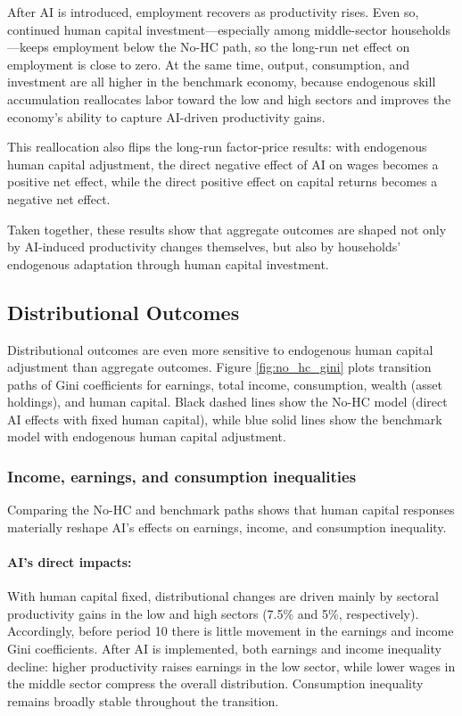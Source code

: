 \documentclass[12pt,english]{article}
\numberwithin{equation}{section}
\begin{document}
After AI is introduced, employment recovers as productivity rises. Even so, continued human capital investment---especially among middle-sector households---keeps employment below the No-HC path, so the long-run net effect on employment is close to zero. At the same time, output, consumption, and investment are all higher in the benchmark economy, because endogenous skill accumulation reallocates labor toward the low and high sectors and improves the economy’s ability to capture AI-driven productivity gains.

This reallocation also flips the long-run factor-price results: with endogenous human capital adjustment, the direct negative effect of AI on wages becomes a positive net effect, while the direct positive effect on capital returns becomes a negative net effect. 

Taken together, these results show that aggregate outcomes are shaped not only by AI-induced productivity changes themselves, but also by households’ endogenous adaptation through human capital investment.

\subsection{Distributional Outcomes}

Distributional outcomes are even more sensitive to endogenous human capital adjustment than aggregate outcomes. Figure \ref{fig:no_hc_gini} plots transition paths of Gini coefficients for earnings, total income, consumption, wealth (asset holdings), and human capital. Black dashed lines show the No-HC model (direct AI effects with fixed human capital), while blue solid lines show the benchmark model with endogenous human capital adjustment.

\subsubsection{Income, earnings, and consumption inequalities}
Comparing the No-HC and benchmark paths shows that human capital responses materially reshape AI’s effects on earnings, income, and consumption inequality.

\paragraph{AI's direct impacts:}
With human capital fixed, distributional changes are driven mainly by sectoral productivity gains in the low and high sectors (7.5\% and 5\%, respectively). Accordingly, before period 10 there is little movement in the earnings and income Gini coefficients. After AI is implemented, both earnings and income inequality decline: higher productivity raises earnings in the low sector, while lower wages in the middle sector compress the overall distribution. Consumption inequality remains broadly stable throughout the transition.
\end{document}
